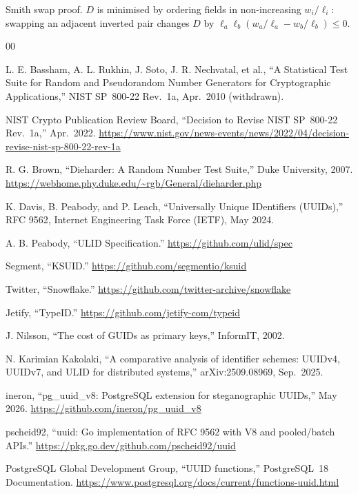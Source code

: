 \documentclass{svproc}
\begin{document}
Smith swap proof. $D$ is minimised by ordering fields in non-increasing $w_i/\ell_i$: swapping an adjacent inverted pair changes $D$ by $\ell_a \ell_b (w_a/\ell_a - w_b/\ell_b) \le 0$.

\begin{thebibliography}{00}

L. E. Bassham, A. L. Rukhin, J. Soto, J. R. Nechvatal, et al., ``A Statistical Test Suite for Random and Pseudorandom Number Generators for Cryptographic Applications,'' NIST SP~800-22 Rev.~1a, Apr.~2010 (withdrawn).

NIST Crypto Publication Review Board, ``Decision to Revise NIST SP~800-22
Rev.~1a,'' Apr.~2022.
\url{https://www.nist.gov/news-events/news/2022/04/decision-revise-nist-sp-800-22-rev-1a}

R. G. Brown, ``Dieharder: A Random Number Test Suite,'' Duke University, 2007. \url{https://webhome.phy.duke.edu/~rgb/General/dieharder.php}

K. Davis, B. Peabody, and P. Leach, ``Universally Unique IDentifiers (UUIDs),'' RFC 9562, Internet Engineering Task Force (IETF), May 2024.

A. B. Peabody, ``ULID Specification.'' \url{https://github.com/ulid/spec}

Segment, ``KSUID.'' \url{https://github.com/segmentio/ksuid}

Twitter, ``Snowflake.'' \url{https://github.com/twitter-archive/snowflake}

Jetify, ``TypeID.'' \url{https://github.com/jetify-com/typeid}

J. Nilsson, ``The cost of GUIDs as primary keys,'' InformIT, 2002.

N. Karimian Kakolaki, ``A comparative analysis of identifier schemes: UUIDv4, UUIDv7, and ULID for distributed systems,'' arXiv:2509.08969, Sep.~2025.

ineron, ``pg\_uuid\_v8: PostgreSQL extension for steganographic UUIDs,'' May 2026. \url{https://github.com/ineron/pg_uuid_v8}

pscheid92, ``uuid: Go implementation of RFC 9562 with V8 and pooled/batch APIs.'' \url{https://pkg.go.dev/github.com/pscheid92/uuid}

PostgreSQL Global Development Group, ``UUID functions,'' PostgreSQL~18 Documentation. \url{https://www.postgresql.org/docs/current/functions-uuid.html}


\end{thebibliography}
\end{document}
